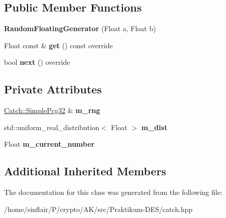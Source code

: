 \subsection*{Public Member Functions}
\begin{DoxyCompactItemize}
\item 
\mbox{\label{classCatch_1_1Generators_1_1RandomFloatingGenerator_abce275ce88f7c3465addd7a98b6c408d}} 
{\bfseries Random\+Floating\+Generator} (Float a, Float b)
\item 
\mbox{\label{classCatch_1_1Generators_1_1RandomFloatingGenerator_a0dea6fa1f9e2647df022f0b588cf0a8f}} 
Float const  \& {\bfseries get} () const override
\item 
\mbox{\label{classCatch_1_1Generators_1_1RandomFloatingGenerator_a6a65e5f16abd884f58c31581b2a0d6db}} 
bool {\bfseries next} () override
\end{DoxyCompactItemize}
\subsection*{Private Attributes}
\begin{DoxyCompactItemize}
\item 
\mbox{\label{classCatch_1_1Generators_1_1RandomFloatingGenerator_a6142d65c14d2749ecb3dbc6949c0ca1c}} 
\hyperlink{classCatch_1_1SimplePcg32}{Catch\+::\+Simple\+Pcg32} \& {\bfseries m\+\_\+rng}
\item 
\mbox{\label{classCatch_1_1Generators_1_1RandomFloatingGenerator_a6a79be0000a6c2a17e4f11dadb43c8ac}} 
std\+::uniform\+\_\+real\+\_\+distribution$<$ Float $>$ {\bfseries m\+\_\+dist}
\item 
\mbox{\label{classCatch_1_1Generators_1_1RandomFloatingGenerator_a3591690761d8da0f4438623a453e6bc0}} 
Float {\bfseries m\+\_\+current\+\_\+number}
\end{DoxyCompactItemize}
\subsection*{Additional Inherited Members}


The documentation for this class was generated from the following file\+:\begin{DoxyCompactItemize}
\item 
/home/sinflair/\+P/crypto/\+A\+K/src/\+Praktikum-\/\+D\+E\+S/catch.\+hpp\end{DoxyCompactItemize}

